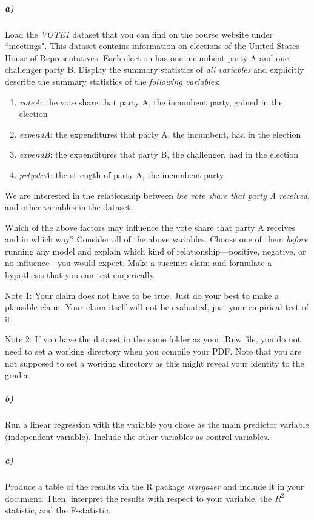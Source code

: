 \documentclass[12pt]{article}
\begin{document}
\subparagraph{a)} Load the \textit{VOTE1} dataset that you can find on the course website under ``meetings". This dataset contains information on elections of the United States House of Representatives. Each election has one incumbent party A and one challenger party B. Display the summary statistics of \textit{all variables} and explicitly describe the summary statistics of the \textit{following variables}:

\begin{enumerate}
	\item \textit{voteA}: the vote share that party A, the incumbent party, gained in the election
	\item \textit{expendA}: the expenditures that party A, the incumbent, had in the election
	\item \textit{expendB}: the expenditures that party B, the challenger, had in the election
	\item \textit{prtystrA}: the strength of party A, the incumbent party
\end{enumerate}

We are interested in the relationship between \textit{the vote share that party A received}, and other variables in the dataset.

Which of the above factors may influence the vote share that party A receives and in which way? Consider all of the above variables. Choose one of them \textit{before} running any model and explain which kind of relationship---positive, negative, or no influence---you would expect. Make a succinct claim and formulate a hypothesis that you can test empirically.

Note 1: Your claim does not have to be true. Just do your best to make a plausible claim. Your claim itself will not be evaluated, just your empirical test of it.

Note 2: If you have the dataset in the same folder as your .Rnw file, you do not need to set a working directory when you compile your PDF. Note that you are not supposed to set a working directory as this might reveal your identity to the grader.

\subparagraph{b)} Run a linear regression with the variable you chose as the main predictor variable (independent variable). Include the other variables as control variables.

\subparagraph{c)} Produce a table of the results via the R package \textit{stargazer} and include it in your document. Then, interpret the results with respect to your variable, the $R^2$ statistic, and the F-statistic.
\end{document}
